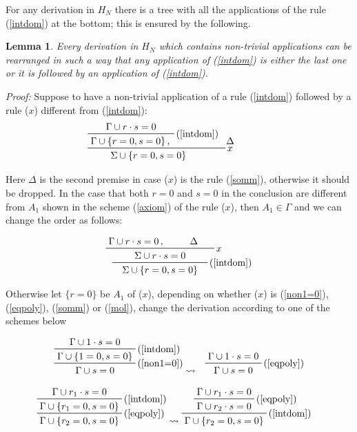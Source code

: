 \documentclass[a4paper,12pt,oneside]{book}
\newtheorem{lemma}[theorem]{Lemma}
\begin{document}
For any derivation in $H_N$ there is a tree with all the applications of the rule (\ref{intdom}) at the bottom; this is ensured by the following.
\begin{lemma}\label{lemma_nullest}\textit{Every derivation in $H_N$ which contains non-trivial applications can be rearranged in such a way that any application of (\ref{intdom}) is either the last one or it is followed by an application of (\ref{intdom})}.
\end{lemma}
\emph{\noindent \textit{Proof: }}Suppose to have a non-trivial application of a rule (\ref{intdom}) followed by a rule ($x$) different from (\ref{intdom}):
$$
\prftree[r]{$x$}
{\prftree[r]{(\ref{intdom})}
{\Gamma\cup r\cdot s=0 }
{\Gamma\cup\{r=0, s=0 \}\,,}
}
{\Delta \hspace{13mm}} 
{\hspace{7mm}\Sigma\cup\{r=0,s=0 \}\hspace{13mm}}
$$

\noindent Here $\Delta$ is the second premise in case ($x$) is the rule (\ref{somm}), otherwise it should be dropped. In the case that both $r=0$ and $s=0$ in the conclusion are different from $A_1$  shown in the scheme (\ref{axiom}) of the rule ($x$), then $A_1\in\Gamma$  and we can change the order as follows:

$$
\prftree[r]{(\ref{intdom})}
{\prftree[r]{$x$}
{\Gamma\cup r\cdot s=0 \, , \hspace{7mm}}    {\Delta \hspace{5mm}}
{\hspace{7mm}\Sigma\cup r\cdot s=0 \hspace{7mm}}}
{ {\Sigma\cup\{r=0, s=0 \}}} 
$$

\noindent Otherwise let $\{r=0\}$ be $A_1$ of ($x$), depending on whether ($x$) is (\ref{non1=0}),(\ref{eqpoly}), (\ref{somm}) or (\ref{mol}), change the derivation according to one of the schemes below


\begin{eqnarray*}
\prftree[r]{(\ref{non1=0})} { \prftree[r]{(\ref{intdom})} {\Gamma \cup  1\cdot s=0 } {\Gamma \cup  \{1=0, s=0\}} } {\Gamma \cup s=0 }
&  \leadsto 
 &\prftree[r]{(\ref{eqpoly})} { \Gamma \cup 1\cdot s=0    } {\Gamma \cup s=0}
\end{eqnarray*}



\begin{eqnarray*}
\prftree[r]{(\ref{eqpoly})} { \prftree[r]{(\ref{intdom})} {\Gamma \cup  r_1\cdot s=0} {\Gamma \cup  \{r_1=0, s=0\}} } {\Gamma \cup \{r_2=0, s=0\}}
&  \leadsto 
\prftree[r]{(\ref{intdom})} { \prftree[r]{(\ref{eqpoly})} {\Gamma \cup  r_1\cdot s=0} {\Gamma \cup  r_2\cdot s=0} } {\Gamma \cup \{r_2=0, s=0\}}
\end{eqnarray*}
\end{document}

